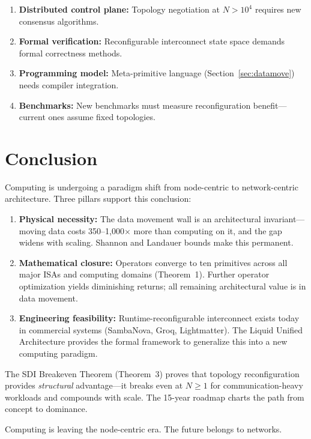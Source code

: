 ﻿\documentclass[review,3p,twocolumn]{elsarticle}
\begin{document}
\begin{enumerate}
    \item \textbf{Distributed control plane:} Topology negotiation at $N>10^4$ requires new consensus algorithms.
    \item \textbf{Formal verification:} Reconfigurable interconnect state space demands formal correctness methods.
    \item \textbf{Programming model:} Meta-primitive language (Section~\ref{sec:datamove}) needs compiler integration.
    \item \textbf{Benchmarks:} New benchmarks must measure reconfiguration benefit---current ones assume fixed topologies.
\end{enumerate}

\section{Conclusion}
\label{sec:conclusion}

Computing is undergoing a paradigm shift from node-centric to network-centric architecture. Three pillars support this conclusion:

\begin{enumerate}
    \item \textbf{Physical necessity:} The data movement wall is an architectural invariant---moving data costs 350--1,000$\times$ more than computing on it, and the gap widens with scaling. Shannon and Landauer bounds make this permanent.
    \item \textbf{Mathematical closure:} Operators converge to ten primitives across all major ISAs and computing domains (Theorem~1). Further operator optimization yields diminishing returns; all remaining architectural value is in data movement.
    \item \textbf{Engineering feasibility:} Runtime-reconfigurable interconnect exists today in commercial systems (SambaNova, Groq, Lightmatter). The Liquid Unified Architecture provides the formal framework to generalize this into a new computing paradigm.
\end{enumerate}

The SDI Breakeven Theorem (Theorem~3) proves that topology reconfiguration provides \emph{structural} advantage---it breaks even at $N\geq1$ for communication-heavy workloads and compounds with scale. The 15-year roadmap charts the path from concept to dominance.

Computing is leaving the node-centric era. The future belongs to networks.
\end{document}
